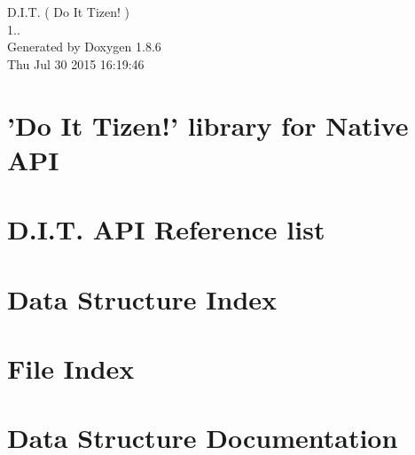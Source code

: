 \documentclass[twoside]{book}
\newcommand{\clearemptydoublepage}{%
  \newpage{\pagestyle{empty}\cleardoublepage}%
}
\begin{document}
\begin{titlepage}
\vspace*{7cm}
\begin{center}%
{\Large D.\-I.\-T. ( Do It Tizen! ) \\[1ex]\large 1.. }\\
\vspace*{1cm}
{\large Generated by Doxygen 1.8.6}\\
\vspace*{0.5cm}
{\small Thu Jul 30 2015 16:19:46}\\
\end{center}
\end{titlepage}
\clearemptydoublepage
\tableofcontents
\clearemptydoublepage
{}

\chapter{'Do It Tizen!' library for Native A\-P\-I}
\label{index}
\chapter{D.\-I.\-T. A\-P\-I Reference list}
\label{md__Users_CDJ_Dropbox_DJ_SSM_DIT_doxygen_DIT_API_Reference_list}

\chapter{Data Structure Index}

\chapter{File Index}

\chapter{Data Structure Documentation}































\end{document}

